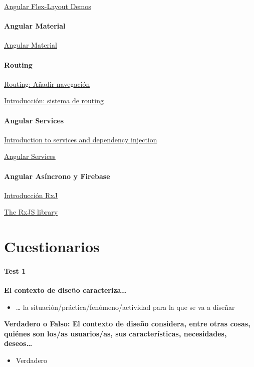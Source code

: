 \documentclass[12pt, twoside, openright]{report} %
\begin{document}
\href{https://tburleson-layouts-demos.firebaseapp.com/#/docs}{Angular Flex-Layout Demos}

\subsubsection{Angular Material}
\href{https://material.angular.io/}{Angular Material}

\subsubsection{Routing}
\href{https://angular.io/start/start-routing}{Routing: Añadir navegación}

\href{https://desarrolloweb.com/articulos/introduccion-sistema-routing-angular.html}{Introducción: sistema de routing}

\subsubsection{Angular Services}
\href{https://angular.io/guide/architecture-services}{Introduction to services and dependency injection}

\href{https://desarrolloweb.com/articulos/servicios-angular.html}{Angular Services}

\subsubsection{Angular Asíncrono y Firebase}
\href{https://rxjs-dev.firebaseapp.com/guide/overview}{Introducción RxJ}

\href{https://angular.io/guide/rx-library}{The RxJS library}

\chapter{Cuestionarios}

\subsubsection{Test 1}

\textbf{El contexto de diseño caracteriza\ldots{}}
\begin{itemize}
  \item \ldots{} la situación/práctica/fenómeno/actividad para la que se va a diseñar
\end{itemize}

\textbf{Verdadero o Falso: El contexto de diseño considera, entre otras cosas, quiénes son los/as usuarios/as, sus características, necesidades, deseos\ldots{}}
\begin{itemize}
  \item Verdadero
\end{itemize}
\end{document}
